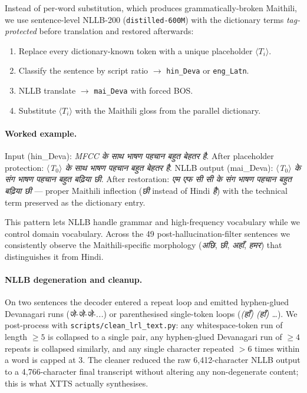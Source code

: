 \documentclass[conference]{IEEEtran}
\newcommand{\hin}[1]{{\hindifont #1}}
\begin{document}
Instead of per-word substitution, which produces
grammatically-broken Maithili, we use sentence-level NLLB-200
(\texttt{distilled-600M}) with the dictionary terms
\emph{tag-protected} before translation and restored afterwards:
\begin{enumerate}
    \item Replace every dictionary-known token with a unique placeholder
    $\langle T_{i}\rangle$.
    \item Classify the sentence by script ratio $\to$ \texttt{hin\_Deva} or
    \texttt{eng\_Latn}.
    \item NLLB translate $\to$ \texttt{mai\_Deva} with forced BOS.
    \item Substitute $\langle T_{i}\rangle$ with the Maithili
    gloss from the parallel dictionary.
\end{enumerate}

\paragraph*{Worked example.} Input (hin\_Deva):
\textit{\hin{MFCC के साथ भाषण पहचान बहुत बेहतर है}}. After placeholder
protection: \textit{$\langle$T$_{0}\rangle$
\hin{के साथ भाषण पहचान बहुत बेहतर है}}. NLLB output (mai\_Deva):
\textit{$\langle$T$_{0}\rangle$ \hin{के संग भाषण पहचान बहुत बढ़िया छी}}.
After restoration: \textit{\hin{एम एफ सी सी के संग भाषण पहचान बहुत बढ़िया छी}}
--- proper Maithili inflection (\textit{\hin{छी}} instead of Hindi
\textit{\hin{है}}) with the technical term preserved as the dictionary
entry.

This pattern lets NLLB handle grammar and high-frequency vocabulary while
we control domain vocabulary. Across the 49 post-hallucination-filter
sentences we consistently observe the Maithili-specific morphology
(\textit{\hin{अछि}}, \textit{\hin{छी}}, \textit{\hin{अहाँ}},
\textit{\hin{हमर}}) that distinguishes it from Hindi.

\paragraph*{NLLB degeneration and cleanup.} On two sentences the decoder
entered a repeat loop and emitted hyphen-glued Devanagari runs
(\textit{\hin{जे-जे-जे-...}}) or parenthesised single-token loops
(\textit{(\hin{हाँ}) (\hin{हाँ}) \ldots}). We post-process with
\texttt{scripts/clean\_lrl\_text.py}: any whitespace-token run of length
$\ge 5$ is collapsed to a single pair, any hyphen-glued Devanagari run
of $\ge 4$ repeats is collapsed similarly, and any single character
repeated $> 6$ times within a word is capped at 3. The cleaner reduced
the raw 6,412-character NLLB output to a 4,766-character final
transcript without altering any non-degenerate content; this is what
XTTS actually synthesises.
\end{document}
